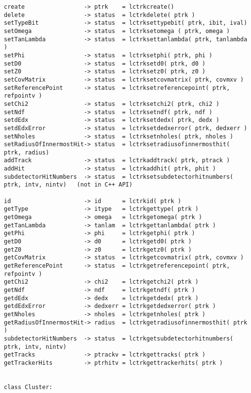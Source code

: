 \begin{scriptsize}
\begin{verbatim}
create                 -> ptrk    = lctrkcreate()
delete                 -> status  = lctrkdelete( ptrk )
setTypeBit             -> status  = lctrksettypebit( ptrk, ibit, ival)
setOmega               -> status  = lctrksetomega ( ptrk, omega )
setTanLambda           -> status  = lctrksettanlambda( ptrk, tanlambda )
setPhi                 -> status  = lctrksetphi( ptrk, phi )
setD0                  -> status  = lctrksetd0( ptrk, d0 )
setZ0                  -> status  = lctrksetz0( ptrk, z0 )
setCovMatrix           -> status  = lctrksetcovmatrix( ptrk, covmxv )
setReferencePoint      -> status  = lctrksetreferencepoint( ptrk, refpointv )
setChi2                -> status  = lctrksetchi2( ptrk, chi2 )
setNdf                 -> status  = lctrksetndf( ptrk, ndf )
setdEdx                -> status  = lctrksetdedx( ptrk, dedx )
setdEdxError           -> status  = lctrksetdedxerror( ptrk, dedxerr )
setNholes              -> status  = lctrksetnholes( ptrk, nholes )
setRadiusOfInnermostHit-> status  = lctrksetradiusofinnermosthit( ptrk, radius)
addTrack               -> status  = lctrkaddtrack( ptrk, ptrack )
addHit                 -> status  = lctrkaddhit( ptrk, phit )
subdetectorHitNumbers  -> status  = lctrksetsubdetectorhitnumbers( ptrk, intv, nintv)   (not in C++ API)

id                     -> id      = lctrkid( ptrk )
getType                -> itype   = lctrkgettype( ptrk )
getOmega               -> omega   = lctrkgetomega( ptrk )
getTanLambda           -> tanlam  = lctrkgettanlambda( ptrk )
getPhi                 -> phi     = lctrkgetphi( ptrk )
getD0                  -> d0      = lctrkgetd0( ptrk )
getZ0                  -> z0      = lctrkgetz0( ptrk )
getCovMatrix           -> status  = lctrkgetcovmatrix( ptrk, covmxv )
getReferencePoint      -> status  = lctrkgetreferencepoint( ptrk, refpointv )
getChi2                -> chi2    = lctrkgetchi2( ptrk )
getNdf                 -> ndf     = lctrkgetndf( ptrk )
getdEdx                -> dedx    = lctrkgetdedx( ptrk )
getdEdxError           -> dedxerr = lctrkgetdedxerror( ptrk )
getNholes              -> nholes  = lctrkgetnholes( ptrk )
getRadiusOfInnermostHit-> radius  = lctrkgetradiusofinnermosthit( ptrk )
subdetectorHitNumbers  -> status  = lctrkgetsubdetectorhitnumbers( ptrk, intv, nintv)
getTracks              -> ptrackv = lctrkgettracks( ptrk )
getTrackerHits         -> ptrhitv = lctrkgettrackerhits( ptrk )


class Cluster:


\end{verbatim}
\end{scriptsize}
